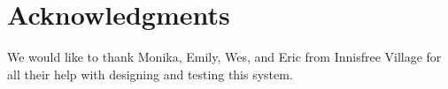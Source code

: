 \documentclass{sig-alternate}
\begin{document}
\section{Acknowledgments}
We would like to thank Monika, Emily, Wes, and Eric from Innisfree Village for all their help with designing and testing this system.
 

%

%
%
\end{document}
